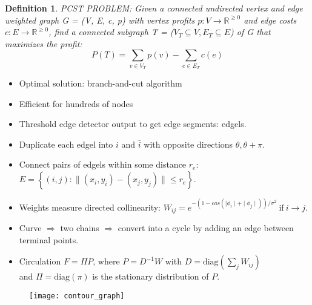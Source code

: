 \documentclass[11pt, a4paper, landscape]{article}
\newtheorem{definition}{Definition}
\begin{document}
\NewPage{}
\vfill
\begin{definition}
PCST PROBLEM: Given a connected undirected vertex and edge weighted graph G = (V, E, c, p) with vertex profits $p: V \rightarrow \mathbb{R}^{\geq 0}$ and edge costs $c: E \rightarrow \mathbb{R}^{\geq 0}$, find a connected subgraph T = ($V_T \subseteq V, E_T \subseteq E$) of G that maximizes the profit:
\begin{equation}
P(T) = \sum\limits_{v \in V_T} p(v) - \sum\limits_{e \in E_T} c(e)
\end{equation}
\end{definition}
\begin{itemize}
\item Optimal solution: branch-and-cut algorithm
\item Efficient for hundreds of nodes
\end{itemize}
\vfill


\NewPage{}
\vfill
\begin{itemize}
\item Threshold edge detector output to get edge segments: edgels.
\item Duplicate each edgel into $i$ and $\bar{i}$ with opposite directions $\theta, \theta + \pi$.
\item Connect pairs of edgels within some distance $r_e$: $E = \left\lbrace (i, j) : \| (x_i, y_i) - (x_j, y_j) \| \leq r_e \right\rbrace $.
\item Weights measure directed collinearity: $W_{ij} = e^{-(1 - cos(\mid \phi_i \mid + \mid \phi_j \mid))/\sigma^2}\ \mathrm{if}\ i \rightarrow j$.
\item Curve $\Rightarrow$ two chains $\Rightarrow$ convert into a cycle by adding an edge between terminal points.
\item Circulation $F = \Pi P$, where $P = D^{-1}W$ with $D = \mathrm{diag}(\sum_jW_{ij})$\\
and $\Pi = \mathrm{diag}(\pi)$ is the stationary distribution of $P$.
\end{itemize}
\begin{figure}
	\centering
	\texttt{[image: contour\_graph]}
\end{figure}
\vfill
\end{document}
